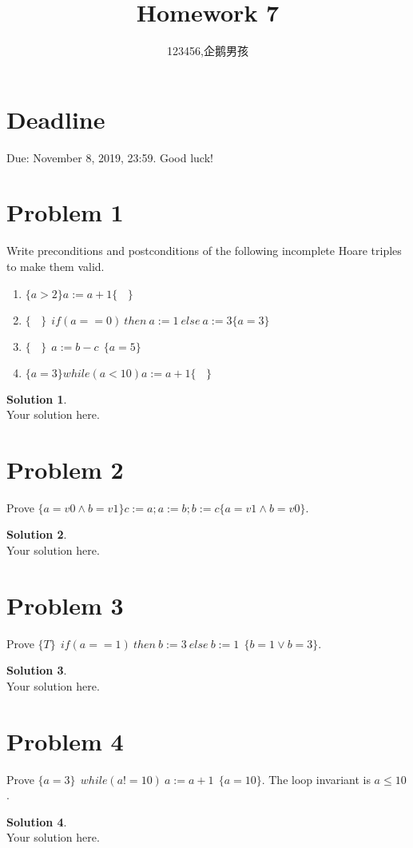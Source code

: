 \documentclass[a4paper,UTF8]{article}
\theoremstyle{definition}
\newtheorem*{solution}{Solution}
\begin{document}
\title{Homework 7}
\author{123456,企鹅男孩}
\maketitle

\section*{Deadline}
Due: November 8, 2019, 23:59. Good luck!

\section*{Problem 1}
Write preconditions and postconditions of the following incomplete Hoare triples to make them valid.
\begin{enumerate}
\item $\{ a>2 \}a:=a+1\{~~~~\}$
\item $ \{~~~~\}~~if(a==0)~then~a:=1~else~a:=3\{ a=3 \} $
\item $ \{~~~~\}~~a:=b-c~~\{a=5\} $
\item $ \{a=3\}while(a<10)a:=a+1\{~~~~\} $
\end{enumerate}
\begin{solution}
~\\
Your solution here.
\end{solution}



\section*{Problem 2}
Prove $ \{ a=v0\wedge b=v1 \} c:=a; a:=b; b:=c \{ a=v1\wedge b=v0 \}  $.
\begin{solution}
~\\
Your solution here.
\end{solution}


\section*{Problem 3}
Prove $ \{ T \}~~if(a==1)~then~b:=3~else~b:=1~~\{ b=1\vee b=3 \}  $.
\begin{solution}
~\\
Your solution here.
\end{solution}

\section*{Problem 4}
Prove $ \{ a= 3 \}~~while(a!=10)~a:=a+1~~\{ a=10 \} $. The loop invariant is $a\leq 10$.
\begin{solution}
~\\
Your solution here.
\end{solution}
\end{document}
